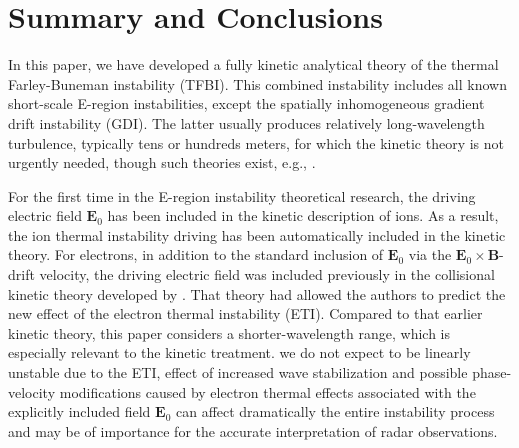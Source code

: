 \documentclass[draft]{agujournal2019}
\renewcommand{\vec}{\mathbf}
\begin{document}
{\section{Summary and Conclusions\label{Summary and conclusions}}

In this paper, we have developed a fully kinetic analytical theory of the
thermal Farley-Buneman instability (TFBI). This combined instability includes
all known short-scale E-region instabilities, except the spatially inhomogeneous gradient
drift instability (GDI). The latter usually produces relatively
long-wavelength turbulence, typically tens or hundreds meters, for which the
kinetic theory is not urgently needed, though such theories exist,
e.g., .

For the first time in the E-region instability theoretical research, 
the driving electric field $\vec{E}_{0}$ has been
included in the kinetic description of ions. As a result, the ion thermal
instability  driving has been automatically included in the kinetic
theory. For electrons, in addition to the standard inclusion of $\vec{E}_{0}$ via the $\vec
{E}_{0}\times\vec{B}$-drift velocity, the driving electric field was included
previously in the collisional kinetic theory developed by
. That theory had allowed the
authors to predict the new effect of the electron thermal instability (ETI).
Compared to that earlier kinetic theory, this paper considers a
shorter-wavelength range, which is especially relevant to the kinetic
treatment. 
 we do not expect 
 to be linearly
unstable due to the ETI, 
 effect of increased wave stabilization and possible
phase-velocity modifications caused by electron thermal effects associated with
the explicitly included field $\vec{E}_{0}$ can affect dramatically the entire
instability process and may be of importance for the accurate interpretation of radar observations.

}
\end{document}
